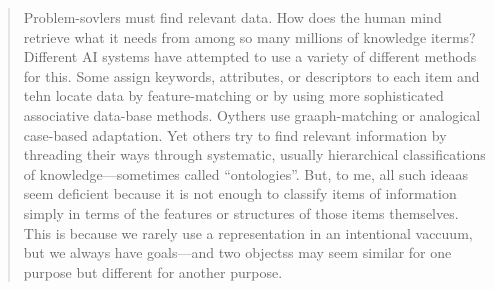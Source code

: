 \begin{quote}
Problem-sovlers must find relevant data.  How does the human mind retrieve what it needs from among so many millions of knowledge iterms?  Different AI systems have attempted to use a variety of different methods for this.  Some assign keywords, attributes, or descriptors to each item and tehn locate data by feature-matching or by using more sophisticated associative data-base methods.  Oythers use graaph-matching or analogical case-based adaptation.  Yet others try to find relevant information by threading their ways through systematic, usually hierarchical classifications of knowledge---sometimes called ``ontologies''.  But, to me, all such ideaas seem deficient because it is not enough to classify items of information simply in terms of the features or structures of those items themselves.  This is because we rarely use a representation in an intentional vaccuum, but we always have goals---and two objectss may seem similar for one purpose but different for another purpose.
\end{quote}




\endgroup

\vfill
